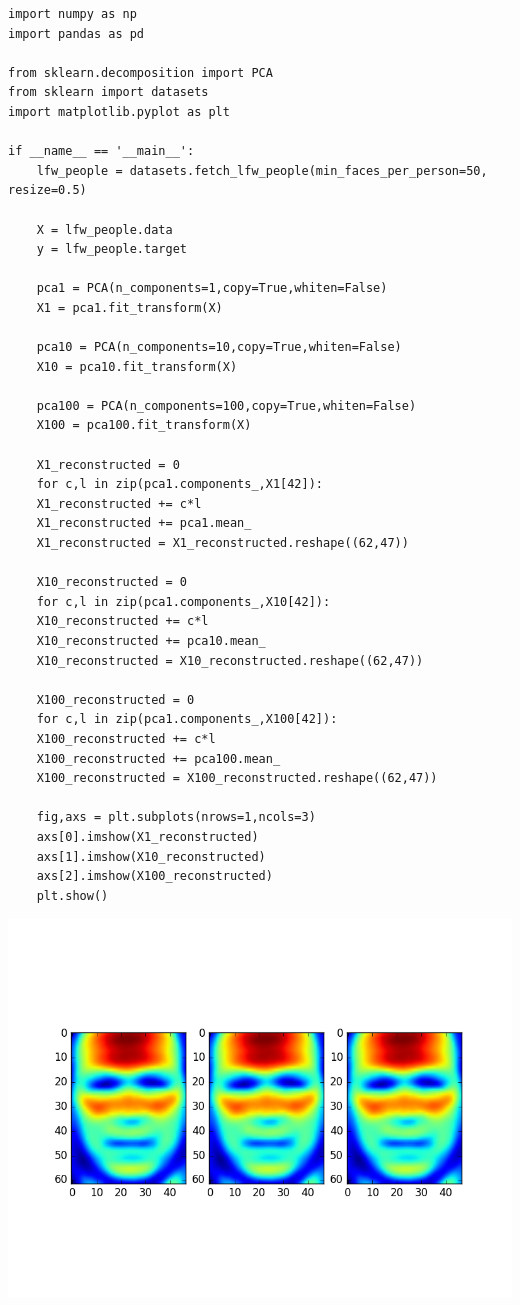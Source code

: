 \documentclass[12pt]{article}
\begin{document}
\begin{flushleft}
			\begin{lstlisting}
import numpy as np 
import pandas as pd

from sklearn.decomposition import PCA
from sklearn import datasets
import matplotlib.pyplot as plt

if __name__ == '__main__':
	lfw_people = datasets.fetch_lfw_people(min_faces_per_person=50, resize=0.5)
	
	X = lfw_people.data
	y = lfw_people.target
	
	pca1 = PCA(n_components=1,copy=True,whiten=False)
	X1 = pca1.fit_transform(X)
	
	pca10 = PCA(n_components=10,copy=True,whiten=False)
	X10 = pca10.fit_transform(X)
	
	pca100 = PCA(n_components=100,copy=True,whiten=False)
	X100 = pca100.fit_transform(X)
	
	X1_reconstructed = 0
	for c,l in zip(pca1.components_,X1[42]):
	X1_reconstructed += c*l
	X1_reconstructed += pca1.mean_
	X1_reconstructed = X1_reconstructed.reshape((62,47))
	
	X10_reconstructed = 0
	for c,l in zip(pca1.components_,X10[42]):
	X10_reconstructed += c*l
	X10_reconstructed += pca10.mean_
	X10_reconstructed = X10_reconstructed.reshape((62,47))
	
	X100_reconstructed = 0
	for c,l in zip(pca1.components_,X100[42]):
	X100_reconstructed += c*l
	X100_reconstructed += pca100.mean_
	X100_reconstructed = X100_reconstructed.reshape((62,47))
	
	fig,axs = plt.subplots(nrows=1,ncols=3)
	axs[0].imshow(X1_reconstructed)
	axs[1].imshow(X10_reconstructed)
	axs[2].imshow(X100_reconstructed)
	plt.show()

			\end{lstlisting}
			
			\includegraphics[scale=0.5]{HW3_3C.png}
			\label{fig:graph 3C}
			

\end{flushleft}
\end{document}
